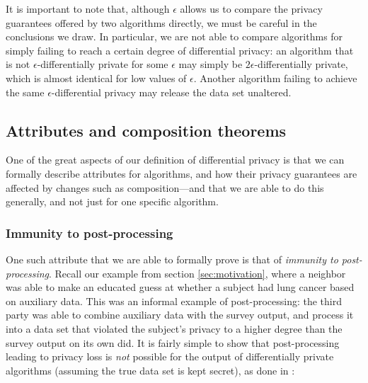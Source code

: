 \documentclass[12pt]{article}
\begin{document}
It is important to note that, although $\epsilon$ allows us to compare the privacy guarantees offered by two algorithms directly, we must be careful in the conclusions we draw. In particular, we are not able to compare algorithms for simply failing to reach a certain degree of differential privacy: an algorithm that is not $\epsilon$-differentially private for some $\epsilon$ may simply be $2\epsilon$-differentially private, which is almost identical for low values of $\epsilon$. Another algorithm failing to achieve the same $\epsilon$-differential privacy may release the data set unaltered.



\subsection{Attributes and composition theorems \label{sec:composition}}

One of the great aspects of our definition of differential privacy is that we can formally describe attributes for algorithms, and how their privacy guarantees are affected by changes such as composition---and that we are able to do this generally, and not just for one specific algorithm.

\subsubsection{Immunity to post-processing}

One such attribute that we are able to formally prove is that of \emph{immunity to post-processing}. Recall our example from section \ref{sec:motivation}, where a neighbor was able to make an educated guess at whether a subject had lung cancer based on auxiliary data. This was an informal example of post-processing: the third party was able to combine auxiliary data with the survey output, and process it into a data set that violated the subject's privacy to a higher degree than the survey output on its own did. It is fairly simple to show that post-processing leading to privacy loss is \emph{not} possible for the output of differentially private algorithms (assuming the true data set is kept secret), as done in \cite{dwork_privacybook}:
\end{document}

